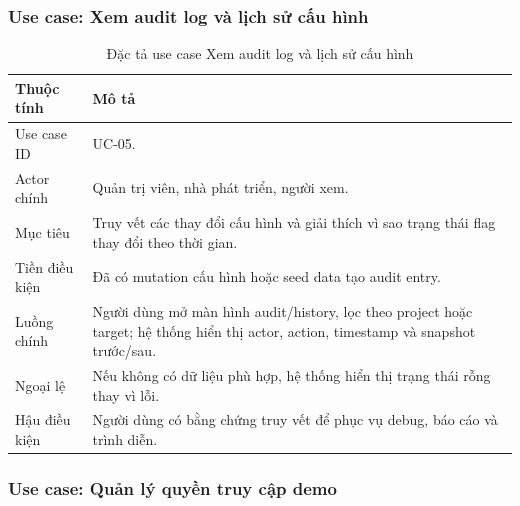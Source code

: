 \subsubsection{Use case: Xem audit log và lịch sử cấu hình}

\begin{table}[H]
    \centering
    \caption{Đặc tả use case Xem audit log và lịch sử cấu hình}
    \label{tab:uc-view-audit-history}
    \begin{tabular}{p{} p{}}
        \toprule
        \textbf{Thuộc tính} & \textbf{Mô tả} \\
        \midrule
        Use case ID & UC-05. \\
        Actor chính & Quản trị viên, nhà phát triển, người xem. \\
        Mục tiêu & Truy vết các thay đổi cấu hình và giải thích vì sao trạng thái flag thay đổi theo thời gian. \\
        Tiền điều kiện & Đã có mutation cấu hình hoặc seed data tạo audit entry. \\
        Luồng chính & Người dùng mở màn hình audit/history, lọc theo project hoặc target; hệ thống hiển thị actor, action, timestamp và snapshot trước/sau. \\
        Ngoại lệ & Nếu không có dữ liệu phù hợp, hệ thống hiển thị trạng thái rỗng thay vì lỗi. \\
        Hậu điều kiện & Người dùng có bằng chứng truy vết để phục vụ debug, báo cáo và trình diễn. \\
        \bottomrule
    \end{tabular}
\end{table}

\subsubsection{Use case: Quản lý quyền truy cập demo}

